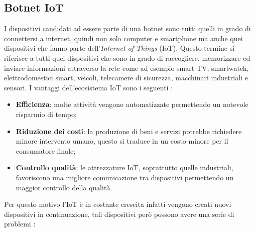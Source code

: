 \subsection{Botnet IoT}
I dispositivi candidati ad essere parte di una botnet sono tutti quelli in grado di connettersi a internet, quindi non solo computer e smartphone ma anche quei dispositivi che fanno parte dell'\emph{Internet of Things} (IoT). Questo termine si riferisce a tutti quei dispositivi che sono in grado di raccogliere, memorizzare ed inviare informazioni attraverso la rete come ad esempio smart TV, smartwatch, elettrodomestici smart, veicoli, telecamere di sicurezza, macchinari industriali e sensori. I vantaggi dell'ecosistema IoT sono i seguenti \cite{iot_vantaggi}:
\begin{itemize}
    \item \textbf{Efficienza}: molte attività vengono automatizzate permettendo un notevole risparmio di tempo;
    \item \textbf{Riduzione dei costi}: la produzione di beni e servizi potrebbe richiedere minore intervento umano, questo si traduce in un costo minore per il consumatore finale;
    \item \textbf{Controllo qualità}: le attrezzature IoT, soprattutto quelle industriali, favoriscono una migliore comunicazione tra dispositivi permettendo un maggior controllo della qualità.
    
\end{itemize}
Per questo motivo l'IoT è in costante crescita infatti vengono creati nuovi dispositivi in continuazione, tali dispositivi però possono avere una serie di problemi \cite{iot_svantaggi}:

